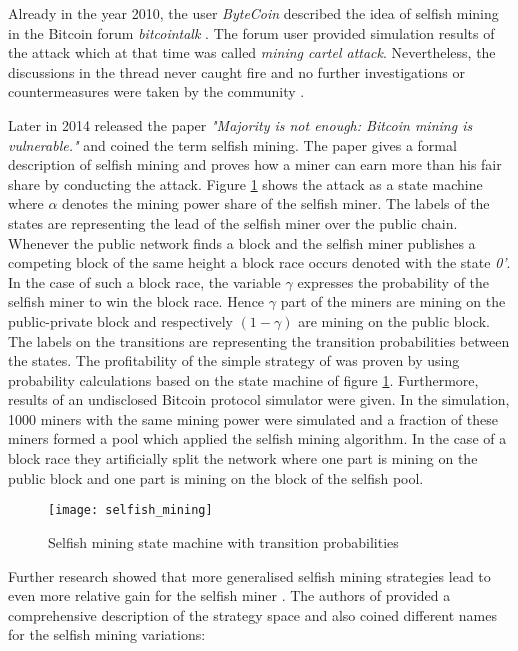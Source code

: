 Already in the year 2010, the user \textit{ByteCoin} described the idea of selfish mining in the Bitcoin forum \textit{bitcointalk} \cite{ByteCoin2010}.
The forum user provided simulation results of the attack which at that time was called \textit{mining cartel attack}.
Nevertheless, the discussions in the thread never caught fire and no further investigations or countermeasures were taken by the community \cite{BitcoinTalk2010, bahack2013theoretical}.

Later in 2014 \cite{eyal2014majority} released the paper \textit{"Majority is not enough: Bitcoin mining is vulnerable."} and coined the term selfish mining.
The paper gives a formal description of selfish mining and proves how a miner can earn more than his fair share by conducting the attack.
Figure \ref{fig:selfish_mining} shows the attack as a state machine where $\alpha$ denotes the mining power share of the selfish miner.
The labels of the states are representing the lead of the selfish miner over the public chain.
Whenever the public network finds a block and the selfish miner publishes a competing block of the same height a block race occurs denoted with the state \textit{0'}.
In the case of such a block race, the variable $\gamma$ expresses the probability of the selfish miner to win the block race.
Hence $\gamma$ part of the miners are mining on the public-private block and respectively $(1 - \gamma)$ are mining on the public block.
The labels on the transitions are representing the transition probabilities between the states.
The profitability of the simple strategy of \cite{eyal2014majority} was proven by using probability calculations based on the state machine of figure \ref{fig:selfish_mining}.
Furthermore, results of an undisclosed Bitcoin protocol simulator were given.
In the simulation, 1000 miners with the same mining power were simulated and a fraction of these miners formed a pool which applied the selfish mining algorithm.
In the case of a block race they artificially split the network where one part is mining on the public block and one part is mining on the block of the selfish pool.

\begin{figure}[t]
\texttt{[image: selfish\_mining]}
\centering
\caption{Selfish mining state machine with transition probabilities \cite{eyal2014majority}}
\label{fig:selfish_mining}
\end{figure}

Further research showed that more generalised selfish mining strategies lead to even more relative gain for the selfish miner \cite{nayak2016stubborn,sapirshtein2016optimal, gervais2015tampering, gervais2016security, bahack2013theoretical}.
The authors of \cite{nayak2016stubborn} provided a comprehensive description of the strategy space and also coined different names for the selfish mining variations:

